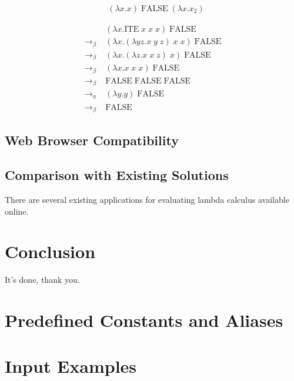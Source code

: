 \documentclass[a4paper,10pt]{article}
\begin{document}
\begin{align*}
&(\lambda x.x)\;\mathrm{FALSE}\;(\lambda x.x_{2})
\end{align*}

\begin{align*}
&(\lambda x.\mathrm{ITE}\;x\;x\;x)\;\mathrm{FALSE}\\
\to_\beta\;&(\lambda x.(\lambda yz.x\;y\;z)\;x\;x)\;\mathrm{FALSE}\\
\to_\beta\;&(\lambda x.(\lambda z.x\;x\;z)\;x)\;\mathrm{FALSE}\\
\to_\beta\;&(\lambda x.x\;x\;x)\;\mathrm{FALSE}\\
\to_\beta\;&\mathrm{FALSE}\;\mathrm{FALSE}\;\mathrm{FALSE}\\
\to_\eta\;&(\lambda y.y)\;\mathrm{FALSE}\\
\to_\beta\;&\mathrm{FALSE}
\end{align*}

\subsection{Web Browser Compatibility}
\subsection{Comparison with Existing Solutions}
There are several existing applications for evaluating lambda calculus available online.

\cite{Interpreter1}
\cite{Interpreter2}
\cite{Interpreter3}
\cite{Interpreter4}
\cite{Interpreter5}
\cite{Interpreter6}

\section{Conclusion}
It's done, thank you.

\printbibliography

\appendix
\section{Predefined Constants and Aliases}
\section{Input Examples}
\end{document}
